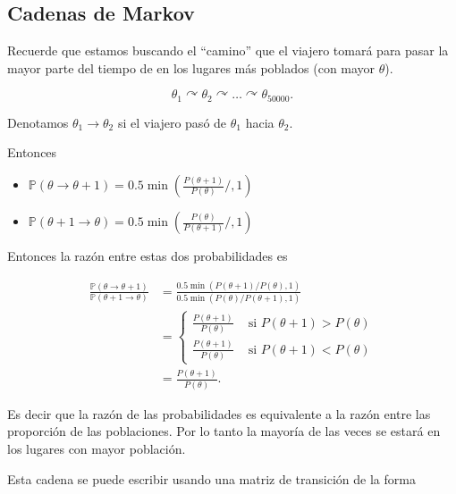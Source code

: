 \documentclass[
  12pt,
]{book}
\providecommand{\tightlist}{%
  \setlength{\itemsep}{0pt}\setlength{\parskip}{0pt}}
\theoremstyle{definition}
\theoremstyle{definition}
\theoremstyle{definition}
\theoremstyle{remark}
\begin{document}
\hypertarget{cadenas-de-markov}{%
\subsection{Cadenas de Markov}\label{cadenas-de-markov}}

Recuerde que estamos buscando el \enquote{camino} que el viajero tomará para pasar la mayor parte del tiempo de en los lugares más poblados (con mayor \(\theta\)).

\begin{equation*}
\theta_{1} \curvearrowright \theta_{2} \curvearrowright \ldots \curvearrowright \theta_{50000}.
\end{equation*}

Denotamos \(\theta_{1}\to\theta_{2}\) si el viajero pasó de \(\theta_{1}\) hacia \(\theta_{2}\).

Entonces

\begin{itemize}
\tightlist
\item
  \(\mathbb{P}\left(\theta \rightarrow \theta+1\right)=0.5 \min \left(\frac{P(\theta+1)}{P(\theta)} / , 1\right)\)
\item
  \(\mathbb{P}\left(\theta + 1 \rightarrow \theta\right)=0.5 \min \left(\frac{P(\theta)}{P(\theta+1)} / , 1\right)\)
\end{itemize}

Entonces la razón entre estas dos probabilidades es

\begin{align*}
    \frac{\mathbb{P}\left(\theta \rightarrow \theta+1\right)}{\mathbb{P}\left(\theta +1 \rightarrow \theta\right)} &=\frac{0.5 \min (P(\theta+1) / P(\theta), 1)}{0.5 \min (P(\theta) / P(\theta+1), 1)} \\
    &=\left\{\begin{array}{ll}
        \frac{P(\theta+1)}{P(\theta) } & \text { si } P(\theta+1)>P(\theta) \\
        \frac{P(\theta+1) }{P(\theta)} & \text { si } P(\theta+1)<P(\theta)
    \end{array}\right.\\
    &=\frac{P(\theta+1)}{P(\theta)}.
\end{align*}

Es decir que la razón de las probabilidades es equivalente a la razón entre las proporción de las poblaciones. Por lo tanto la mayoría de las veces se estará en los lugares con mayor población.

Esta cadena se puede escribir usando una matriz de transición de la forma
\end{document}
